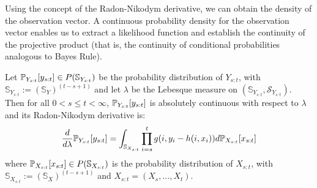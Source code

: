 Using the concept of the Radon-Nikodym derivative, we can obtain the density of the observation vector. A continuous probability density for the observation vector enables us to extract a likelihood function and establish the continuity of the projective product (that is, the continuity of conditional probabilities analogous to Bayes Rule).
\begin{lemma}
	Let $\mathbb{P}_{Y_{s:t}}{[y_{s:t}]} \in P(\mathbb{S}_{Y_{s:t}})$ be the probability distribution of $Y_{s:t}$, with $\mathbb{S}_{Y_{s:t}} := (\mathbb{S}_Y)^{(t-s+1)}$  and let $\lambda$ be the Lebesque measure on $(\mathbb{S}_{Y_{s:t}}, \mathcal{S}_{Y_{s:t}})$. Then  for all $0 < s \leq t < \infty $, $\mathbb{P}_{Y_{s:t}}{[y_{s:t}]}$ is absolutely continuous with respect to $\lambda$ and its Radon-Nikodym derivative is:
	\begin{align}
	\frac{d}{d\lambda}\mathbb{P}_{Y_{s:t}}{[y_{s:t}]} = \int_{\mathbb{S}_{X_{s:t}}} \prod_{i=s}^{t} g(i, y_i - h(i, x_i)) d\mathbb{P}_{X_{s:t}}{[x_{s:t}]} \label{eqn:probdensityY}
	\end{align} where $\mathbb{P}_{X_{s:t}}{[x_{s:t}]} \in  P(\mathbb{S}_{X_{s:t}})$ is the probability distribution of $X_{s:t}$, with $\mathbb{S}_{X_{s:t}} := (\mathbb{S}_X)^{(t-s+1)}$ and $X_{s:t} = (X_s, \hdots, X_t)$. 
	

\end{lemma}
